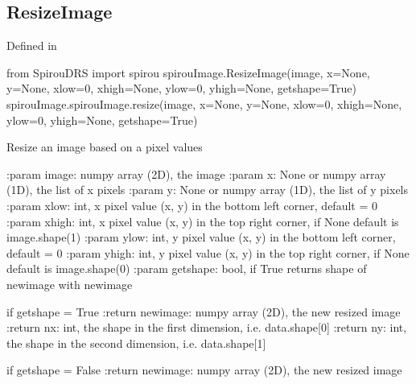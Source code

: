 \begin{minipage}{\textwidth}
\subsection{ResizeImage}

Defined in \spirouImage{}

\begin{pythonbox}
from SpirouDRS import spirou
spirouImage.ResizeImage(image, x=None, y=None, xlow=0, xhigh=None, ylow=0, yhigh=None, getshape=True)
spirouImage.spirouImage.resize(image, x=None, y=None, xlow=0, xhigh=None, ylow=0, yhigh=None, getshape=True)
\end{pythonbox}

\begin{pythondocstring}
Resize an image based on a pixel values

:param image: numpy array (2D), the image
:param x: None or numpy array (1D), the list of x pixels
:param y: None or numpy array (1D), the list of y pixels
:param xlow: int, x pixel value (x, y) in the bottom left corner,
             default = 0
:param xhigh:  int, x pixel value (x, y) in the top right corner,
             if None default is image.shape(1)
:param ylow: int, y pixel value (x, y) in the bottom left corner,
             default = 0
:param yhigh: int, y pixel value (x, y) in the top right corner,
             if None default is image.shape(0)
:param getshape: bool, if True returns shape of newimage with newimage

if getshape = True
:return newimage: numpy array (2D), the new resized image
:return nx: int, the shape in the first dimension, i.e. data.shape[0]
:return ny: int, the shape in the second dimension, i.e. data.shape[1]

if getshape = False
:return newimage: numpy array (2D), the new resized image
\end{pythondocstring}
\end{minipage}


